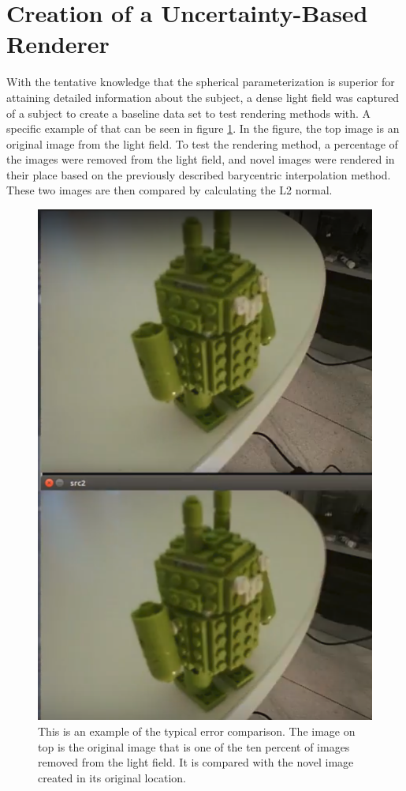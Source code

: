 \documentclass[12pt]{report}
\begin{document}
\section{Creation of a Uncertainty-Based Renderer}
With the tentative knowledge that the spherical parameterization is superior for attaining detailed information about the subject, a dense light field was captured of a subject to create a baseline data set to test rendering methods with. A specific example of that can be seen in figure \ref{fig:images_compared}. In the figure, the top image is an original image from the light field. To test the rendering method, a percentage of the images were removed from the light field, and novel images were rendered in their place based on the previously described barycentric interpolation method. These two images are then compared by calculating the L2 normal.
\begin{figure}[!ht]
	\centering
	\includegraphics[scale=0.50]{compared_images.png}
	\caption{This is an example of the typical error comparison. The image on top is the original image that is one of the ten percent of images removed from the light field. It is compared with the novel image created in its original location.}
	\label{fig:images_compared}
\end{figure}
\end{document}
